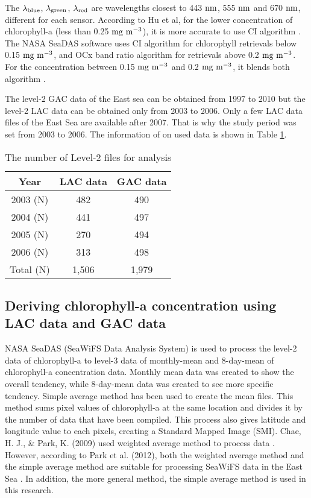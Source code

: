 The $\rm {\lambda}_{blue}$, $\rm {\lambda}_{green}$, $\rm {\lambda}_{red}$ are wavelengths closest to 443 $\rm nm$, 555 $\rm nm$ and 670 $\rm nm$, different for each sensor. According to Hu et al, for the lower concentration of chlorophyll-a (less than 0.25 $\rm mg~m^{-3}$), it is more accurate to use CI algorithm \cite{hu2012chlorophyll}. The NASA SeaDAS software uses CI algorithm for chlorophyll retrievals below 0.15 $\rm mg~m^{-3}$, and OCx band ratio algorithm for retrievals above 0.2 $\rm mg~m^{-3}$. For the concentration between 0.15 $\rm mg~m^{-3}$ and 0.2 $\rm mg~m^{-3}$, it blends both algorithm \cite{NASASeaFiWSdata}.


The level-2 GAC data of the East sea can be obtained from 1997 to 2010 but the level-2 LAC data can be obtained only from 2003 to 2006. Only a few LAC data files of the East Sea are available after 2007. That is why the study period was set from 2003 to 2006. The information of on used data is shown in Table \ref{data_information}.


 \begin{table}[h]
	\centering
	\caption{The number of Level-2 files for analysis}
	\label{data_information}
	\begin{tabular}{c  c  c  }
		\toprule
		Year & LAC data  & GAC data \\ %
		\midrule
		2003 (N) & 482 & 490 \\ %
		2004 (N) & 441 & 497 \\ %
		2005 (N) & 270 & 494 \\ %
		2006 (N) & 313 & 498 \\ %
			\midrule
		Total (N) & 1,506 & 1,979 \\ %
		\bottomrule
	\end{tabular}
\end{table}




\hfill \break


 \subsection{Deriving chlorophyll-a concentration using LAC data and GAC data}
 
NASA SeaDAS (SeaWiFS Data Analysis System) is used to process the level-2 data of chlorophyll-a to level-3 data of monthly-mean and 8-day-mean of chlorophyll-a concentration data. Monthly mean data was created to show the overall tendency, while 8-day-mean data was created to see more specific tendency. Simple average method has been used to create the mean files. This method sums pixel values of chlorophyll-a at the same location and divides it by the number of data that have been compiled. This process also gives latitude and longitude value to each pixels, creating a Standard Mapped Image (SMI). Chae, H. J., \& Park, K. (2009) used weighted average method to process data \cite{chae2009characteristics}. However, according to Park et al. (2012), both the weighted average method and the simple average method are suitable for processing SeaWiFS data in the East Sea \cite{park2012comparison}. In addition, the more general method, the simple average method is used in this research.

